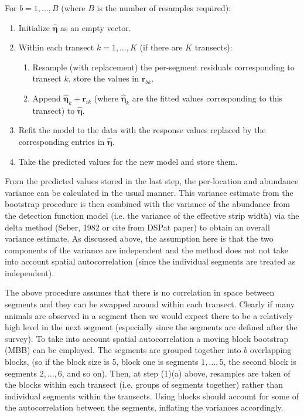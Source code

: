 \documentclass[useAMS,referee]{biom}
\begin{document}
For $b=1,\ldots,B$ (where $B$ is the number of resamples required):
\begin{enumerate}
	\item Initialize $\hat{\bm{\eta}}$ as an empty vector.
	\item Within each transect $k=1,\ldots,K$ (if there are $K$ transects):
	\begin{enumerate}
		\item Resample (with replacement) the per-segment residuals corresponding to transect $k$, store the values in $\mathbf{r}_{bk}$.
		\item Append $\hat{\bm{\eta}}_{k}+\mathbf{r}_{ik}$ (where $\hat{\bm{\eta}}_{k}$ are the fitted values corresponding to this transect) to $\hat{\bm{\eta}}$.
	\end{enumerate}
	\item Refit the model to the data with the response values replaced by the corresponding entries in $\hat{\bm{\eta}}$.
	\item Take the predicted values for the new model and store them.
\end{enumerate}
From the predicted values stored in the last step, the per-location and abundance variance can be calculated in the usual manner. This variance estimate from the bootstrap procedure is then combined with the variance of the abundance from the detection function model (i.e. the variance of the effective strip width) via the delta method (Seber, 1982 or cite from DSPat paper) to obtain an overall variance estimate. As discussed above, the assumption here is that the two components of the variance are independent and the method does not not take into account spatial autocorrelation (since the individual segments are treated as independent).

The above procedure assumes that there is no correlation in space between segments and they can be swapped around within each transect. Clearly if many animals are observed in a segment then we would expect there to be a relatively high level in the next segment (especially since the segments are defined after the survey). To take into account spatial autocorrelation a moving block bootstrap (MBB) can be employed. The segments are grouped together into $b$ overlapping blocks, (so if the block size is 5, block one is segments $1,\ldots,5$, the second block is segments $2,\ldots,6$, and so on). Then, at step (1)(a) above, resamples are taken of the blocks within each transect (i.e. groups of segments together) rather than individual segments within the transects. Using blocks should account for some of the autocorrelation between the segments, inflating the variances accordingly.
\end{document}
